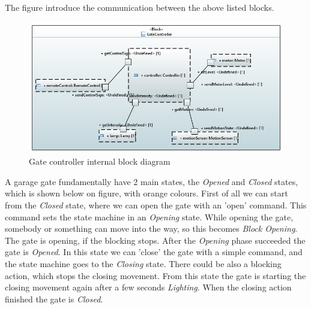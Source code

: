 The  figure introduce the communication between the above listed blocks.

\begin{figure}[!ht]
	\centering
	\includegraphics[width=150mm, keepaspectratio]{figures/IBDGateController.png}
	\caption{Gate controller internal block diagram}
	\label{fig:GateControler}
\end{figure}

A garage gate fundamentally have 2 main states, the \textit{Opened} and \textit{Closed} states, which is shown below on  figure, with orange colours.  First of all we can start from the \textit{Closed} state, where we can open the gate with an 'open' command. This command sets the state machine in an \textit{Opening} state. While opening the gate, somebody or something can move into the way, so this becomes \textit{Block Opening}. The gate is opening, if the blocking stops. After the \textit{Opening} phase succeeded the gate is \textit{Opened}. In this state we can 'close' the gate with a simple command, and the state machine goes to the \textit{Closing} state. There could be also a blocking action, which stops the closing movement. From this state the gate is starting the closing movement again after a few seconds \textit{Lighting}. When the closing action finished the gate is \textit{Closed}.

